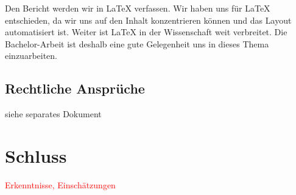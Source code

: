 \documentclass[a4paper,ngerman, 11pt]{report}
\newcommand\Diskussionspunkt[1]{\textcolor{red}{#1}}
\begin{document}
Den Bericht werden wir in LaTeX verfassen. Wir haben uns für LaTeX entschieden, da wir uns auf den Inhalt konzentrieren können und das Layout automatisiert ist. Weiter ist LaTeX in der Wissenschaft weit verbreitet. Die Bachelor-Arbeit ist deshalb eine gute Gelegenheit uns in dieses Thema einzuarbeiten.


\section{Rechtliche Ansprüche}
siehe separates Dokument


\chapter{Schluss}
\Diskussionspunkt{Erkenntnisse, Einschätzungen}




{}	

\end{document}
